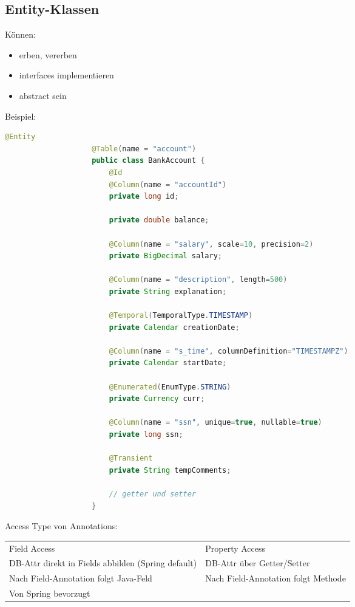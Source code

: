 \documentclass[a4paper, landscape, 8pt]{scrartcl}
\begin{document}
\begin{multicols*}{4}
        \subsection{Entity-Klassen}
        Können:
        \begin{itemize}
            \item erben, vererben
            \item interfaces implementieren
            \item abstract sein
        \end{itemize}
        Beispiel:
        \begin{lstlisting}[language=java]
                    @Entity
                    @Table(name = "account")
                    public class BankAccount {
                        @Id
                        @Column(name = "accountId")
                        private long id;

                        private double balance;

                        @Column(name = "salary", scale=10, precision=2)
                        private BigDecimal salary;

                        @Column(name = "description", length=500)
                        private String explanation;

                        @Temporal(TemporalType.TIMESTAMP)
                        private Calendar creationDate;

                        @Column(name = "s_time", columnDefinition="TIMESTAMPZ")
                        private Calendar startDate;

                        @Enumerated(EnumType.STRING)
                        private Currency curr;

                        @Column(name = "ssn", unique=true, nullable=true)
                        private long ssn;

                        @Transient
                        private String tempComments;

                        // getter und setter
                    }
        \end{lstlisting}

        Access Type von Annotations:
        \begin{tabularx}{\columnwidth}{X | X}
            Field Access & Property Access \\
            DB-Attr direkt in Fields abbilden (Spring default) & DB-Attr über Getter/Setter \\
            Nach Field-Annotation folgt Java-Feld & Nach Field-Annotation folgt Methode \\
            Von Spring bevorzugt &
        \end{tabularx}


\end{multicols*}
\end{document}
